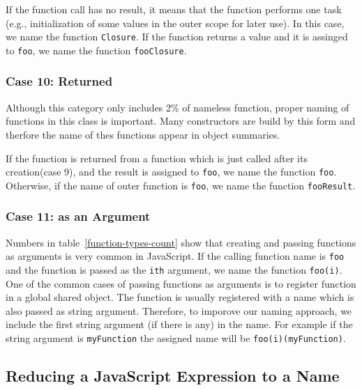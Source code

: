 \documentclass{acm_proc_article-sp}
\begin{document}
{If the function call has no result, it means that the function performs one task (e.g., initialization of some values in the outer scope for later use). In this case, we name the function {\small\texttt{Closure}}. If the function returns a value and it is assinged to {\small\texttt{foo}}, we name the function {\small\texttt{fooClosure}}.

\subsubsection{Case 10: Returned}
Although this category only includes 2\% of nameless function, proper naming of functions in this class is important. Many constructors are build by this form and therfore the name of thes functions appear in object summaries.

If the function is returned from a function which is just called after its creation(case 9), and the result is assigned to {\small\texttt{foo}}, we name the function {\small\texttt{foo}}. Otherwise, if the name of outer function is {\small\texttt{foo}}, we name the function {\small\texttt{fooResult}}.


\subsubsection{Case 11: as an Argument}
Numbers in table~\ref{function-types-count} show that creating and passing functions as arguments is very common in JavaScript. If the calling function name is 
{\small\texttt{foo}} and the function is passed as the {\small\texttt{ith}} argument, we name the function {\small\texttt{foo(i)}}. One of the common cases of passing
functions as arguments is to register function in a global shared object. The function is usually registered with a name which is also passed as string argument. Therefore, to imporove our naming approach, we include the first string argument (if there is any) in the name. For example if the string argument is {\small\texttt{myFunction}} the assigned name will be {\small\texttt{foo(i)(myFunction)}}.


\subsection{Reducing a JavaScript Expression to a Name}
\label{sec:general-element-naming}



}
\end{document}
